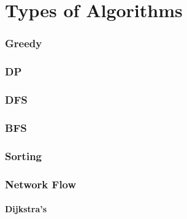 \documentclass{article}
\begin{document}
\part{Types of Algorithms}
\section{Greedy}
\section{DP}
\section{DFS}
\section{BFS}
\section{Sorting}
\section{Network Flow}
\subsection{Dijkstra's}
\end{document}
